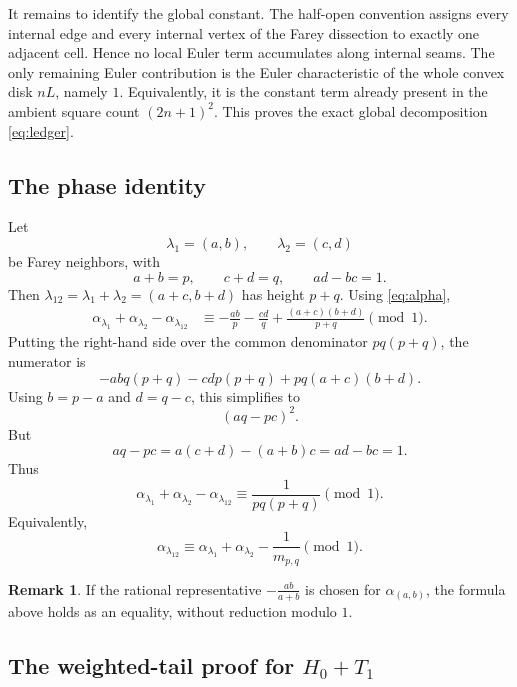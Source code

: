 \documentclass[a4paper,american,11pt]{amsart}
\theoremstyle{plain}
\theoremstyle{definition}
\newtheorem{remark}[theorem]{Remark}
\begin{document}
It remains to identify the global constant.  The half-open convention assigns
every internal edge and every internal vertex of the Farey dissection to
exactly one adjacent cell.  Hence no local Euler term accumulates along
internal seams.  The only remaining Euler contribution is the Euler
characteristic of the whole convex disk \(nL\), namely \(1\).  Equivalently,
it is the constant term already present in the ambient square count
\((2n+1)^2\).  This proves the exact global decomposition \eqref{eq:ledger}.

\subsection{The phase identity}

Let
\[
 \lambda_1=(a,b),\qquad \lambda_2=(c,d)
\]
be Farey neighbors, with
\[
 a+b=p,
 \qquad
 c+d=q,
 \qquad
 ad-bc=1.
\]
Then \(\lambda_{12}=\lambda_1+\lambda_2=(a+c,b+d)\) has height \(p+q\).
Using \eqref{eq:alpha},
\begin{align*}
 \alpha_{\lambda_1}+\alpha_{\lambda_2}-\alpha_{\lambda_{12}}
 &\equiv
 -\frac{ab}{p}-\frac{cd}{q}+\frac{(a+c)(b+d)}{p+q}
 \pmod1.
\end{align*}
Putting the right-hand side over the common denominator \(pq(p+q)\), the
numerator is
\[
 -abq(p+q)-cdp(p+q)+pq(a+c)(b+d).
\]
Using \(b=p-a\) and \(d=q-c\), this simplifies to
\[
 (aq-pc)^2.
\]
But
\[
 aq-pc=a(c+d)-(a+b)c=ad-bc=1.
\]
Thus
\[
 \alpha_{\lambda_1}+\alpha_{\lambda_2}-\alpha_{\lambda_{12}}
 \equiv \frac{1}{pq(p+q)}\pmod1.
\]
Equivalently,
\[
 \alpha_{\lambda_{12}}
 \equiv
 \alpha_{\lambda_1}+\alpha_{\lambda_2}-\frac1{m_{p,q}}
 \pmod1.
\]

\begin{remark}
If the rational representative \(-\frac{ab}{a+b}\) is chosen for
\(\alpha_{(a,b)}\), the formula above holds as an equality, without reduction
modulo \(1\).
\end{remark}

\subsection{The weighted-tail proof for \(H_0+T_1\)}
\end{document}
